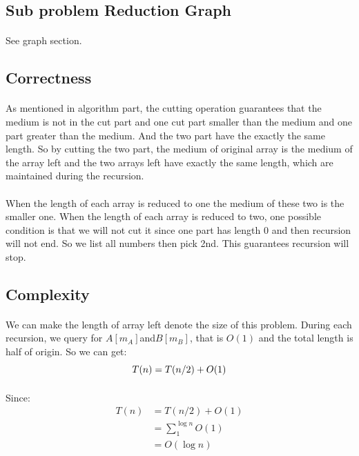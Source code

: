 \documentclass[]{article}
\begin{document}
        \subsection{Sub problem Reduction Graph}
            \paragraph{}See graph section.
        \subsection{Correctness}
            \paragraph{} As mentioned in algorithm part, the cutting operation guarantees that the medium is not in the cut part and one cut part smaller than the medium and one part greater than the medium. And the two part have the exactly the same length. So by cutting the two part, the medium of original array is the medium of the array left and the two arrays left have exactly the same length, which are maintained during the recursion.
            \paragraph{} When the length of each array is reduced to one the medium of these two is the smaller one. When the length of each array is reduced to two, one possible condition is that we will not cut it since one part has length 0 and then recursion will not end. So we list all numbers then pick 2nd. This guarantees recursion will stop.
        \subsection{Complexity}
            \paragraph{} We can make the length of array left  denote the size of this problem. During each recursion, we query for $A[m_A]$and$B[m_B]$, that is $O(1)$ and the total length is half of origin. So we can get:
            \begin{equation*}
                T(n) = T(n/2) + O(1)\\
            \end{equation*}
            
            \paragraph{} Since:
            \begin{align*}
                T(n) &= T(n/2) + O(1) \\
                     &= \sum_{1}^{\log{n}} {O(1)} \\
                     &= O(\log n)
            \end{align*}
\end{document}
